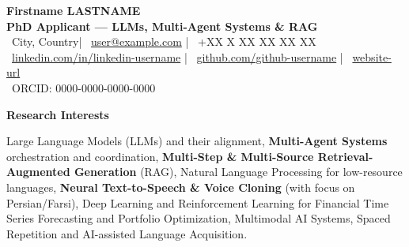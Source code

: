 \documentclass[11pt,a4paper]{article}
\makeatletter
\newcommand{\itemspace}{\vspace{0.4em}}
\newcommand{\sectionspace}{\itemspace}
\newcommand{\cvsection}[1]{
    \sectionspace
    \noindent\textcolor{primary}{\Large \textbf{#1}} \textcolor{primary}{\hrulefill}
    \par\vspace{0.4em}
}
\providecommand{\cvname}{Firstname LASTNAME}
\providecommand{\cvemail}{user@example.com}
\providecommand{\cvphone}{+XX X XX XX XX XX}
\providecommand{\cvlocation}{City, Country}
\providecommand{\cvgithub}{github-username}
\providecommand{\cvlinkedin}{linkedin-username}
\providecommand{\cvwebsite}{website-url}
\providecommand{\cvorcid}{0000-0000-0000-0000}
\makeatother
\begin{document}
\begin{center}
    {\huge \textcolor{primary}{\textbf{\cvname}}}\\
    \vspace{0.1cm}
    \textcolor{primary}{\textbf{PhD Applicant — LLMs, Multi-Agent Systems \& RAG}}\\
    \vspace{0.2cm}
    \textcolor{primary}{\faMapMarker*} \ \cvlocation \quad|\quad
    \textcolor{primary}{\faEnvelope} \ \href{mailto:\cvemail}{\cvemail} \quad|\quad
    \textcolor{primary}{\faPhone} \ \cvphone \\
    \vspace{0.1cm}
    \textcolor{primary}{\faLinkedin} \ \href{https://linkedin.com/in/\cvlinkedin}{linkedin.com/in/\cvlinkedin} \quad|\quad
    \textcolor{primary}{\faGithub} \ \href{https://github.com/\cvgithub}{github.com/\cvgithub} \quad|\quad
    \textcolor{primary}{\faGlobe} \ \href{https://\cvwebsite}{\cvwebsite} \\
    \textcolor{primary}{\faGlobe} \ ORCID: \cvorcid
\end{center}

\cvsection{Research Interests}
\noindent
Large Language Models (LLMs) and their alignment, \textbf{Multi-Agent Systems} orchestration and coordination, \textbf{Multi-Step \& Multi-Source Retrieval-Augmented Generation} (RAG), Natural Language Processing for low-resource languages, \textbf{Neural Text-to-Speech \& Voice Cloning} (with focus on Persian/Farsi), Deep Learning and Reinforcement Learning for Financial Time Series Forecasting and Portfolio Optimization, Multimodal AI Systems, Spaced Repetition and AI-assisted Language Acquisition.
\end{document}

